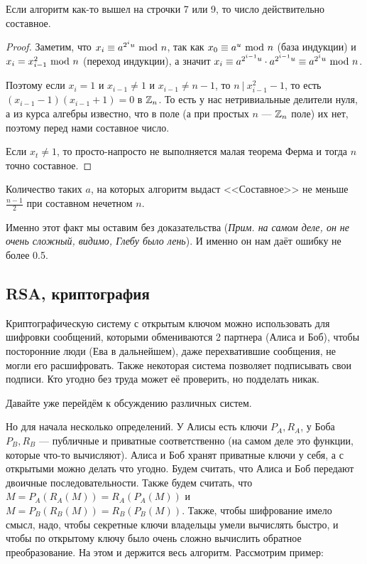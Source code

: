 \documentclass[a4paper, 12pt]{article}
\begin{document}
\begin{Lemma}
  Если алгоритм как-то вышел на строчки 7 или 9, то число действительно 
  составное.
\end{Lemma}

\begin{proof}
  Заметим, что $x_i \equiv a^{2^i u} \ \text{mod} \  n$, так как $x_0 \equiv a^{u} \ \text{mod} \  n$
  (база индукции) и 
  $x_i = x_{i - 1}^2 \ \text{mod} \  n$ (переход индукции), а значит $x_i \equiv a^{2^{i -
  1} u} \cdot
  a^{2^{i - 1} u} \equiv a^{2^{i} u} \ \text{mod} \  n$. 

  Поэтому если $x_i = 1$ и $x_{i - 1} \neq 1$ и $x_{i - 1} \neq n - 1$, то 
  $n \ | \ x_{i - 1}^2 - 1$, то есть $(x_{i - 1} - 1)(x_{i - 1} + 1) = 0$ в 
  $\mathbb{Z}_n$.
  То есть у нас нетривиальные делители нуля, а из курса алгебры известно, что в
  поле (а при простых $n$ --- $\mathbb{Z}_n$ поле) их нет, поэтому перед нами составное 
  число.

  Если $x_t \neq 1$, то просто-напросто не выполняется малая теорема Ферма и 
  тогда $n$ точно составное.
\end{proof}

\begin{Lemma}
Количество таких $a$, 
на которых алгоритм выдаст <<Составное>> не меньше $\frac{n - 1}{2}$ при
составном нечетном $n$.
\end{Lemma}

Именно этот факт мы оставим без доказательства ({\it Прим. на самом деле, он не очень
сложный, видимо, Глебу было лень}).
И именно он нам даёт ошибку не более 0.5.

\subsection{RSA, криптография}

Криптографическую систему с открытым ключом можно использовать для шифровки
сообщений, которыми обмениваются 2 партнера (Алиса и Боб), чтобы посторонние
люди (Ева в дальнейшем), даже перехватившие сообщения,
не могли его расшифровать. Также некоторая система позволяет подписывать 
свои подписи. Кто угодно без труда может её проверить, но подделать никак.

Давайте уже перейдём к обсуждению различных систем.

Но для начала несколько определений. У Алисы есть 
ключи $P_{A}, R_{A}$, у Боба $P_{B}, R_{B}$ --- 
публичные и приватные соответственно (на самом деле это функции, которые 
что-то вычисляют). Алиса и Боб хранят приватные ключи у себя,
а с открытыми можно делать что угодно. Будем считать, что Алиса и Боб передают
двоичные последовательности. Также будем считать, что $M = P_{A}(R_{A}(M)) = R_{
A}(P_{A}(M))$ и $M = P_{B}(R_{B}(M)) = R_{B}(P_{B}(M))$. Также, чтобы шифрование
имело смысл, надо, чтобы секретные ключи владельцы умели вычислять быстро, и
чтобы по открытому ключу было очень сложно вычислить обратное преобразование.
На этом и держится весь алгоритм. Рассмотрим пример:
\end{document}
